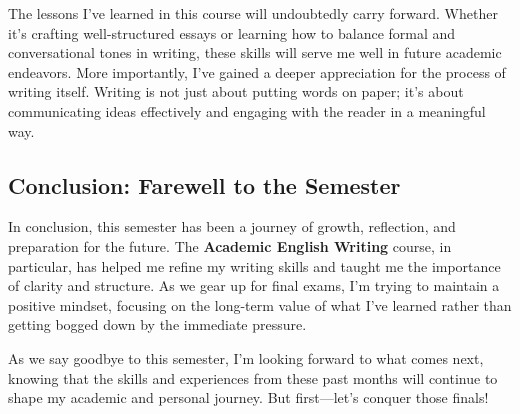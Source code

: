 \documentclass[a4paper]{article} 	%
\begin{document}
The lessons I’ve learned in this course will undoubtedly carry forward. Whether it’s crafting well-structured essays or learning how to balance formal and conversational tones in writing, these skills will serve me well in future academic endeavors. More importantly, I’ve gained a deeper appreciation for the process of writing itself. Writing is not just about putting words on paper; it’s about communicating ideas effectively and engaging with the reader in a meaningful way.

\subsection*{Conclusion: Farewell to the Semester}

In conclusion, this semester has been a journey of growth, reflection, and preparation for the future. The \textbf{Academic English Writing} course, in particular, has helped me refine my writing skills and taught me the importance of clarity and structure. As we gear up for final exams, I’m trying to maintain a positive mindset, focusing on the long-term value of what I’ve learned rather than getting bogged down by the immediate pressure.

As we say goodbye to this semester, I’m looking forward to what comes next, knowing that the skills and experiences from these past months will continue to shape my academic and personal journey. But first—let’s conquer those finals!




\end{document}
